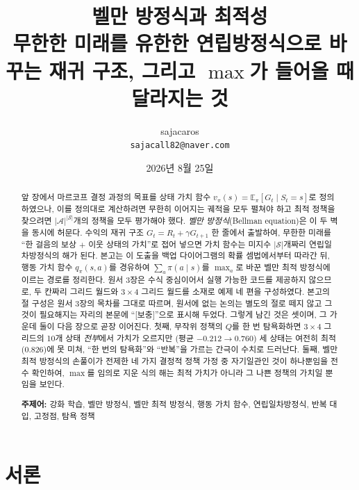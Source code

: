 \documentclass[11pt,a4paper]{article}
\title{\bfseries 벨만 방정식과 최적성\\[2mm]
\large 무한한 미래를 유한한 연립방정식으로 바꾸는 재귀 구조, 그리고 $\max$가 들어올 때 달라지는 것}
\author{sajacaros\\\small \texttt{sajacall82@naver.com}}
\date{2026년 8월 25일}
\newcommand{\E}{\mathbb{E}}
\newcommand{\Sset}{\mathcal{S}}
\newcommand{\Aset}{\mathcal{A}}
\begin{document}
\maketitle

\begin{abstract}
\noindent
앞 장에서 마르코프 결정 과정의 목표를 상태 가치 함수 $v_\pi(s)=\E_\pi[G_t\mid S_t=s]$로 정의하였으나,
이를 정의대로 계산하려면 무한히 이어지는 궤적을 모두 펼쳐야 하고 최적 정책을 찾으려면 $|\Aset|^{|\Sset|}$개의
정책을 모두 평가해야 했다. \emph{벨만 방정식}(Bellman equation)은 이 두 벽을 동시에 허문다. 수익의 재귀
구조 $G_t=R_t+\gamma G_{t+1}$ 한 줄에서 출발하여, 무한한 미래를 ``한 걸음의 보상 $+$ 이웃 상태의 가치''로
접어 넣으면 가치 함수는 미지수 $|\Sset|$개짜리 연립일차방정식의 해가 된다.
본고는 이 도출을 백업 다이어그램의 확률 셈법에서부터 따라간 뒤, 행동 가치 함수 $q_\pi(s,a)$를 경유하여
$\sum_a\pi(a\mid s)$를 $\max_a$로 바꾼 벨만 최적 방정식에 이르는 경로를 정리한다.
원서\cite{dlfs4} 3장은 수식 중심이어서 실행 가능한 코드를 제공하지 않으므로, 두 칸짜리 그리드 월드와
$3\times4$ 그리드 월드를 소재로 예제 네 편을 구성하였다. 본고의 절 구성은 원서 3장의 목차를 그대로
따르며, 원서에 없는 논의는 별도의 절로 떼지 않고 그것이 필요해지는 자리의 본문에 ``[보충]''으로 표시해
두었다. 그렇게 남긴 것은 셋이며, 그 가운데 둘이 다음 장으로 곧장 이어진다. 첫째, 무작위 정책의 $Q$를
한 번 탐욕화하면 $3\times4$ 그리드의 10개 상태 \emph{전부}에서 가치가 오르지만
(평균 $-0.212\to0.760$) 세 상태는 여전히 최적($0.826$)에 못 미쳐,
``한 번의 탐욕화''와 ``반복''을 가르는 간극이 수치로 드러난다. 둘째, 벨만 최적 방정식의 손풀이가
전제한 네 가지 결정적 정책 가정 중 자기일관인 것이 하나뿐임을 전수 확인하여, $\max$를 임의로 지운 식의
해는 최적 가치가 아니라 그 나쁜 정책의 가치일 뿐임을 보인다.

\vspace{2mm}
\noindent\textbf{주제어:} 강화 학습, 벨만 방정식, 벨만 최적 방정식, 행동 가치 함수, 연립일차방정식,
반복 대입, 고정점, 탐욕 정책
\end{abstract}

\tableofcontents
\vspace{4mm}

\section*{서론}
\end{document}
